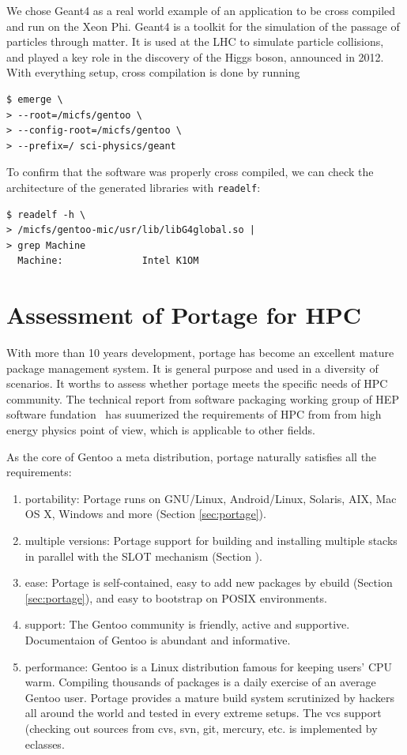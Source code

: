 \documentclass[a4paper,conference]{IEEEtran}
\begin{document}
We chose Geant4 as a real world example of an application to be cross
compiled and run on the Xeon Phi. Geant4 is a toolkit for the
simulation of the passage of particles through matter. It is used at the
LHC to simulate particle collisions, and played a key role in the
discovery of the Higgs boson, announced in 2012. With everything setup,
cross compilation is done by running
\begin{verbatim}
$ emerge \
> --root=/micfs/gentoo \
> --config-root=/micfs/gentoo \
> --prefix=/ sci-physics/geant
\end{verbatim}

To confirm that the software was properly cross compiled, we can check
the architecture of the generated libraries with \verb|readelf|:
\begin{verbatim}
$ readelf -h \
> /micfs/gentoo-mic/usr/lib/libG4global.so |
> grep Machine
  Machine:              Intel K1OM
\end{verbatim}

\section{Assessment of Portage for HPC}
With more than 10 years development, portage has become an excellent
mature package management system.  It is general purpose and used in a
diversity of scenarios.  It worths to assess whether portage meets the
specific needs of HPC community.  The technical report from software
packaging working group of HEP software fundation~\cite{hsf:package}
has suumerized the requirements of HPC from from high energy physics
point of view, which is applicable to other fields.

As the core of Gentoo a meta distribution, portage naturally satisfies
all the requirements:

\begin{enumerate}
\item portability: Portage runs on GNU/Linux, Android/Linux, Solaris,
  AIX, Mac OS X, Windows and more (Section \ref{sec:portage}).
\item multiple versions: Portage support for building and installing
  multiple stacks in parallel with the SLOT mechanism
  (Section \label{sec:ebuild}).
\item ease: Portage is self-contained, easy to add new packages by
  ebuild (Section \ref{sec:portage}), and easy to bootstrap on POSIX
  environments. 
\item support: The Gentoo community is friendly, active and
  supportive.  Documentaion of Gentoo is abundant and informative.
\item performance: Gentoo is a Linux distribution famous for keeping
  users' CPU warm.  Compiling thousands of packages is a daily
  exercise of an average Gentoo user.  Portage provides a mature build
  system scrutinized by hackers all around the world and tested in
  every extreme setups. The vcs support (checking out sources from
  cvs, svn, git, mercury, etc. is implemented by eclasses.
\end{enumerate}
\end{document}
